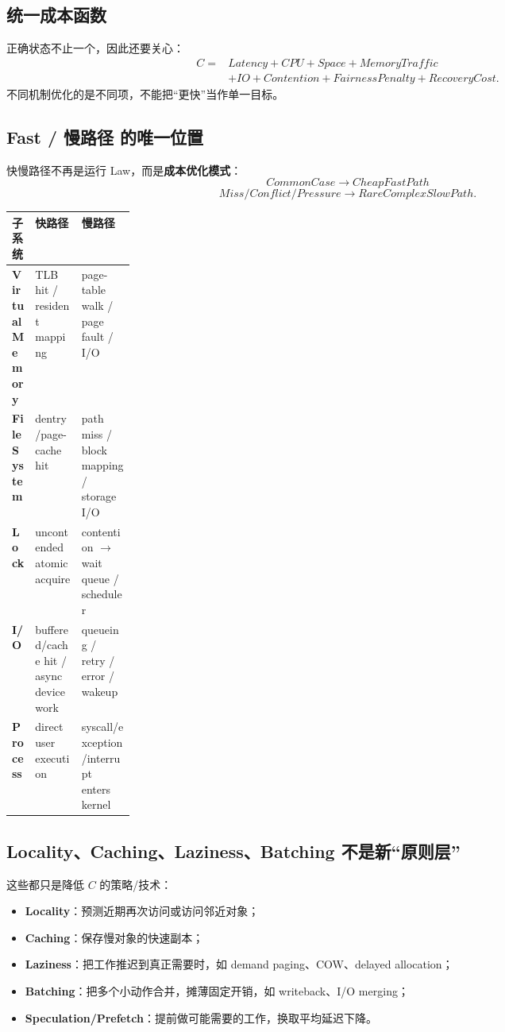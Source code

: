 \documentclass[11pt,a4paper]{ctexart}
\newcommand{\kw}[1]{\textbf{#1}}
\begin{document}
\subsection{统一成本函数}
正确状态不止一个，因此还要关心：
\[
\boxed{\begin{aligned}
C={}&Latency+CPU+Space+MemoryTraffic\\
   &+IO+Contention+FairnessPenalty+RecoveryCost.
\end{aligned}}
\]
不同机制优化的是不同项，不能把“更快”当作单一目标。

\subsection{Fast / 慢路径 的唯一位置}
快慢路径不再是运行 Law，而是\kw{成本优化模式}：
\[
\boxed{CommonCase\rightarrow CheapFastPath}
\]
\[
\boxed{Miss/Conflict/Pressure\rightarrow RareComplexSlowPath}.
\]

\begin{center}
\small
\renewcommand{\arraystretch}{1.25}
\begin{tabularx}{\linewidth}{>{\bfseries}p{0.18\linewidth} X X}
\toprule
子系统 & 快路径 & 慢路径 \\
\midrule
Virtual Memory & TLB hit / resident mapping & page-table walk / page fault / I/O \\
File System & dentry/page-cache hit & path miss / block mapping / storage I/O \\
Lock & uncontended atomic acquire & contention $\to$ wait queue / scheduler \\
I/O & buffered/cache hit / async device work & queueing / retry / error / wakeup \\
Process & direct user execution & syscall/exception/interrupt enters kernel \\
\bottomrule
\end{tabularx}
\end{center}

\subsection{Locality、Caching、Laziness、Batching 不是新“原则层”}
这些都只是降低 $C$ 的策略/技术：
\begin{itemize}
  \item \kw{Locality}：预测近期再次访问或访问邻近对象；
  \item \kw{Caching}：保存慢对象的快速副本；
  \item \kw{Laziness}：把工作推迟到真正需要时，如 demand paging、COW、delayed allocation；
  \item \kw{Batching}：把多个小动作合并，摊薄固定开销，如 writeback、I/O merging；
  \item \kw{Speculation/Prefetch}：提前做可能需要的工作，换取平均延迟下降。
\end{itemize}
\end{document}
